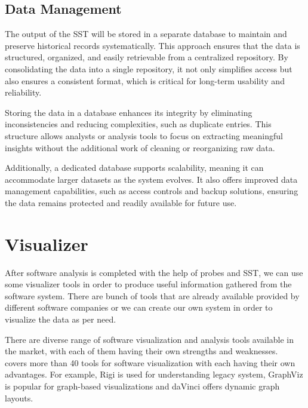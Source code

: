 \subsection{Data Management}

The output of the SST will be stored in a separate database to maintain and preserve historical records systematically. This approach ensures that the data is structured, organized, and easily retrievable from a centralized repository. By consolidating the data into a single repository, it not only simplifies access but also ensures a consistent format, which is critical for long-term usability and reliability. 

Storing the data in a database enhances its integrity by eliminating inconsistencies and reducing complexities, such as duplicate entries. This structure allows analysts or analysis tools to focus on extracting meaningful insights without the additional work of cleaning or reorganizing raw data.

Additionally, a dedicated database supports scalability, meaning it can accommodate larger datasets as the system evolves. It also offers improved data management capabilities, such as access controls and backup solutions, ensuring the data remains protected and readily available for future use.

\section{Visualizer}\label{sec:component-visualizer}

After software analysis is completed with the help of probes and SST, we can use some visualizer tools in order to produce useful information gathered from the software system. There are bunch of tools that are already available provided by different software companies or we can create our own system in order to visualize the data as per need. 

There are diverse range of software visualization and analysis tools available in the market, with each of them having their own strengths and weaknesses.~\citep{SWVizTools2001} covers more than 40 tools for software visualization with each having their own advantages. For example, Rigi is used for understanding legacy system, GraphViz is popular for graph-based visualizations and daVinci offers dynamic graph layouts.

